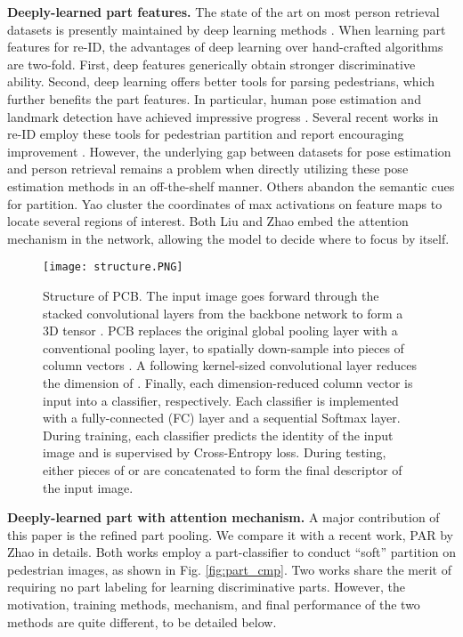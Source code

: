 \documentclass[10pt,twocolumn,letterpaper]{article}
\begin{document}
\textbf{Deeply-learned part features.} 
The state of the art on most person retrieval datasets is presently maintained by deep learning methods \cite{DBLP:journals/corr/ZhengYH16}. When learning part features for re-ID, the advantages of deep learning over hand-crafted algorithms are two-fold. First, deep features generically obtain stronger discriminative ability. Second, deep learning offers better tools for parsing pedestrians, which further benefits the part features. In particular, human pose estimation and landmark detection have achieved impressive progress \cite{pose:Long2015Fully,pose:hourglass,pose:Cao2016Realtime,pose:CPM,pose:DeeperCut}. Several recent works in re-ID employ these tools for pedestrian partition and report encouraging improvement \cite{DBLP:journals/corr/ZhengHLY17,Su2017Pose,Wei2017GLAD}. However, the underlying gap between datasets for pose estimation and person retrieval remains a problem when directly utilizing these pose estimation methods in an off-the-shelf manner. Others abandon the semantic cues for partition. Yao \etal \cite{Yao2017Deep} cluster the coordinates of max activations on feature maps to locate several regions of interest. Both Liu \etal \cite{Liu2017HydraPlus} and Zhao \etal \cite{Zhao2017Deeply} embed the attention mechanism \cite{Xu2015attention_mechanism} in the network, allowing the model to decide where to focus by itself.


\begin{figure*}[t]
\centering
\texttt{[image: structure.PNG]}

\caption{Structure of PCB. The input image goes forward through the stacked convolutional layers from the backbone network to form a 3D tensor \bm{}. PCB replaces the original global pooling layer with a conventional pooling layer, to spatially down-sample \bm{} into  pieces of column vectors \bm{}. A following  kernel-sized convolutional layer reduces the dimension of \bm{}. Finally, each dimension-reduced column vector \bm{} is input into a classifier, respectively. Each classifier is implemented with a fully-connected (FC) layer and a sequential Softmax layer. During training, each classifier predicts the identity of the input image and is supervised by Cross-Entropy loss. During testing, either  pieces of \bm{} or \bm{} are concatenated to form the final descriptor of the input image.}
\label{fig:structure}
\end{figure*}



\textbf{Deeply-learned part with attention mechanism.} A major contribution of this paper is the refined part pooling. We compare it with a recent work, PAR \cite{Yao2017Deep} by Zhao \etal in details. Both works employ a part-classifier to conduct ``soft'' partition on pedestrian images, as shown in Fig. \ref{fig:part_cmp}. Two works share the merit of requiring no part labeling for learning discriminative parts. However, the motivation, training methods, mechanism, and final performance of the two methods are quite different, to be detailed below.
\end{document}
